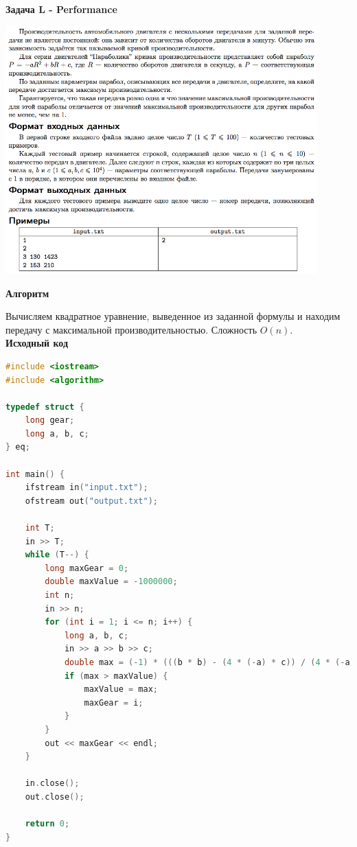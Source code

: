 \documentclass[a4paper,12pt]{article}
\begin{document}
\newpage
\textbf{{\large Задача L - Performance}}

\begin{center}
\includegraphics[width=0.9\textwidth]{OC_Udmurtia/OC_Udmurtia_L.png}\\ [1cm]
\end{center}

\newpage
\textbf{{\large Алгоритм}}

Вычисляем квадратное уравнение, выведенное из заданной формулы и находим передачу с максимальной производительностью. Сложность $O(n)$. \\

\textbf{{\large Исходный код}}
\begin{lstlisting}[language=C++]
#include <iostream>
#include <algorithm>

typedef struct {
    long gear;
    long a, b, c;
} eq;

int main() {
    ifstream in("input.txt");
    ofstream out("output.txt");

    int T;
    in >> T;
    while (T--) {
        long maxGear = 0;
        double maxValue = -1000000;
        int n;
        in >> n;
        for (int i = 1; i <= n; i++) {
            long a, b, c;
            in >> a >> b >> c;
            double max = (-1) * (((b * b) - (4 * (-a) * c)) / (4 * (-a)));
            if (max > maxValue) {
                maxValue = max;
                maxGear = i;
            }
        }
        out << maxGear << endl;
    }

    in.close();
    out.close();

    return 0;
}
\end{lstlisting}
\end{document}

